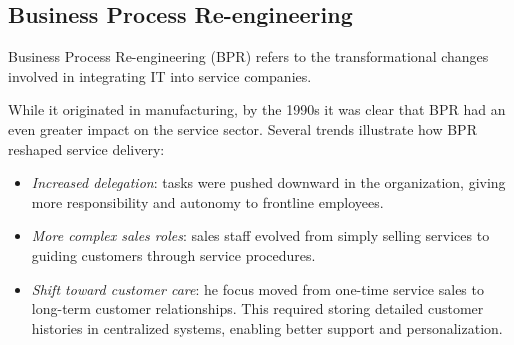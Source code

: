 \subsection{Business Process Re-engineering}
\begin{definition}
    Business Process Re-engineering (BPR) refers to the transformational changes involved in integrating IT into service companies.
\end{definition}
\noindent While it originated in manufacturing, by the 1990s it was clear that BPR had an even greater impact on the service sector. 
Several trends illustrate how BPR reshaped service delivery:
\begin{itemize}
    \item \textit{Increased delegation}: tasks were pushed downward in the organization, giving more responsibility and autonomy to frontline employees.
    \item \textit{More complex sales roles}: sales staff evolved from simply selling services to guiding customers through service procedures.
    \item \textit{Shift toward customer care}: he focus moved from one-time service sales to long-term customer relationships.
         This required storing detailed customer histories in centralized systems, enabling better support and personalization.
\end{itemize}